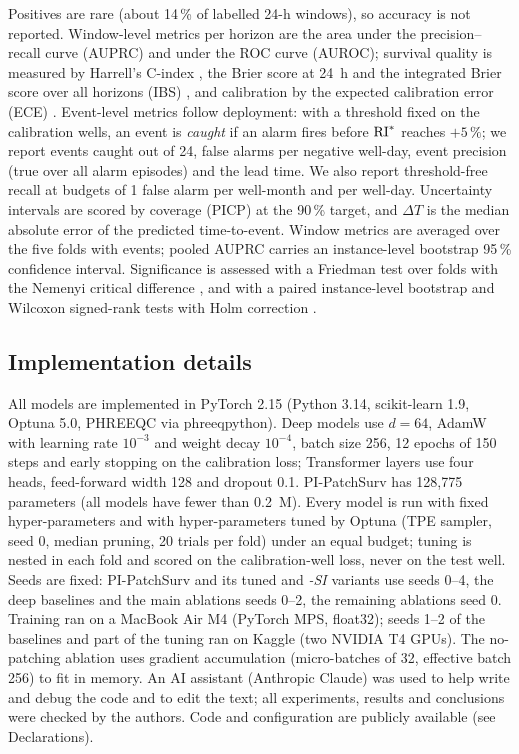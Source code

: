 Positives are rare (about 14\,\% of labelled 24-h windows), so accuracy is not reported. Window-level
metrics per horizon are the area under the precision--recall curve (AUPRC) \citep{saito2015} and under the
ROC curve (AUROC); survival quality is measured by Harrell's C-index \citep{harrell1982}, the Brier score at
24~h and the integrated Brier score over all horizons (IBS) \citep{graf1999}, and calibration by the expected
calibration error (ECE) \citep{guo2017}. Event-level metrics follow deployment: with a threshold fixed on the
calibration wells, an event is \emph{caught} if an alarm fires before $\mathrm{RI}^{*}$ reaches $+5\,\%$; we report events
caught out of 24, false alarms per negative well-day, event precision (true over all alarm episodes) and
the lead time. We also report threshold-free recall at budgets of 1 false alarm per well-month and per
well-day. Uncertainty intervals are scored by coverage (PICP) at the 90\,\% target, and $\Delta T$ is the
median absolute error of the predicted time-to-event. Window metrics are averaged over the five folds with
events; pooled AUPRC carries an instance-level bootstrap 95\,\% confidence interval. Significance is assessed
with a Friedman test over folds with the Nemenyi critical difference \citep{demsar2006}, and with a paired
instance-level bootstrap and Wilcoxon signed-rank tests with Holm correction \citep{holm1979}.

\subsection{Implementation details}

All models are implemented in PyTorch \citep{paszke2019} 2.15 (Python 3.14, scikit-learn 1.9, Optuna 5.0,
PHREEQC via phreeqpython). Deep models use $d=64$, AdamW with learning rate $10^{-3}$ and weight decay
$10^{-4}$, batch size 256, 12 epochs of 150 steps and early stopping on the calibration loss; Transformer
layers use four heads, feed-forward width 128 and dropout 0.1. PI-PatchSurv has 128,775 parameters (all
models have fewer than 0.2~M). Every model is run with fixed hyper-parameters and with hyper-parameters
tuned by Optuna \citep{akiba2019} (TPE sampler, seed 0, median pruning, 20 trials per fold) under an equal
budget; tuning is nested in each fold and scored on the calibration-well loss, never on the test well.
Seeds are fixed: PI-PatchSurv and its tuned and \emph{-SI} variants use seeds 0--4, the deep baselines and
the main ablations seeds 0--2, the remaining ablations seed 0. Training ran on a MacBook Air M4 (PyTorch MPS,
float32); seeds 1--2 of the baselines and part of the tuning ran on Kaggle (two NVIDIA T4 GPUs). The
no-patching ablation uses gradient accumulation (micro-batches of 32, effective batch 256) to fit in memory.
An AI assistant (Anthropic Claude) was used to help write and debug the code and to edit the text; all
experiments, results and conclusions were checked by the authors. Code and configuration are publicly
available (see Declarations).
